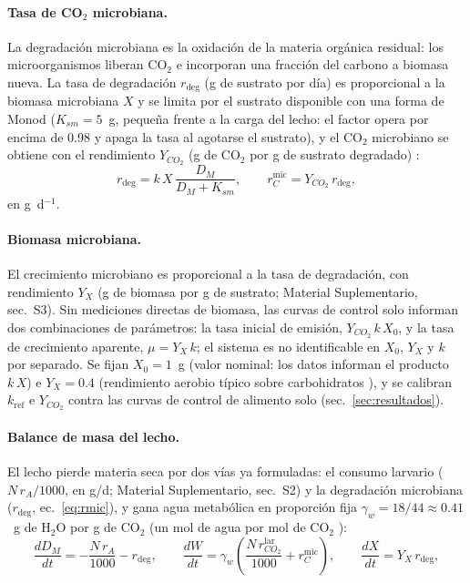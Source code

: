 \paragraph{Tasa de CO$_2$ microbiana.}
La degradación microbiana es la oxidación de la materia orgánica residual: los microorganismos liberan CO$_2$ e incorporan una fracción del carbono a biomasa nueva. La tasa de degradación $r_{\mathrm{deg}}$ (g de sustrato por día) es proporcional a la biomasa microbiana $X$ y se limita por el sustrato disponible con una forma de Monod ($K_{sm} = 5$~g, pequeña frente a la carga del lecho: el factor opera por encima de 0.98 y apaga la tasa al agotarse el sustrato), y el CO$_2$ microbiano se obtiene con el rendimiento $Y_{CO_2}$ (g de CO$_2$ por g de sustrato degradado) \parencite{roels1980,shulerbioprocess2017}:
\begin{equation}
r_{\mathrm{deg}} = k\,X\,\frac{D_M}{D_M + K_{sm}},
\qquad
r_{C}^{\mathrm{mic}} = Y_{CO_2}\,r_{\mathrm{deg}},
\label{eq:rmic}
\end{equation}
en g~d$^{-1}$.

\paragraph{Biomasa microbiana.}
El crecimiento microbiano es proporcional a la tasa de degradación, con rendimiento $Y_X$ (g de biomasa por g de sustrato; Material Suplementario, sec.~S3). Sin mediciones directas de biomasa, las curvas de control solo informan dos combinaciones de parámetros: la tasa inicial de emisión, $Y_{CO_2}\,k\,X_0$, y la tasa de crecimiento aparente, $\mu = Y_X\,k$; el sistema es no identificable en $X_0$, $Y_X$ y $k$ por separado. Se fijan $X_0 = 1$~g (valor nominal: los datos informan el producto $k\,X$) e $Y_X = 0.4$ (rendimiento aerobio típico sobre carbohidratos \parencite{roels1980}), y se calibran $k_{\mathrm{ref}}$ e $Y_{CO_2}$ contra las curvas de control de alimento solo (sec.~\ref{sec:resultados}).

\paragraph{Balance de masa del lecho.}
El lecho pierde materia seca por dos vías ya formuladas: el consumo larvario ($N\,r_A/1000$, en g/d; Material Suplementario, sec.~S2) y la degradación microbiana ($r_{\mathrm{deg}}$, ec.~\ref{eq:rmic}), y gana agua metabólica en proporción fija $\gamma_w = 18/44 \approx 0.41$~g de H$_2$O por g de CO$_2$ (un mol de agua por mol de CO$_2$ \parencite{atkinsPhysicalChemistry2014}):
\begin{equation}
\frac{dD_M}{dt} = -\frac{N\,r_A}{1000} - r_{\mathrm{deg}},
\qquad
\frac{dW}{dt} = \gamma_w\left(\frac{N\,r_{CO_2}^{\mathrm{lar}}}{1000} + r_C^{\mathrm{mic}}\right),
\qquad
\frac{dX}{dt} = Y_X\,r_{\mathrm{deg}},
\label{eq:lecho}
\end{equation}

